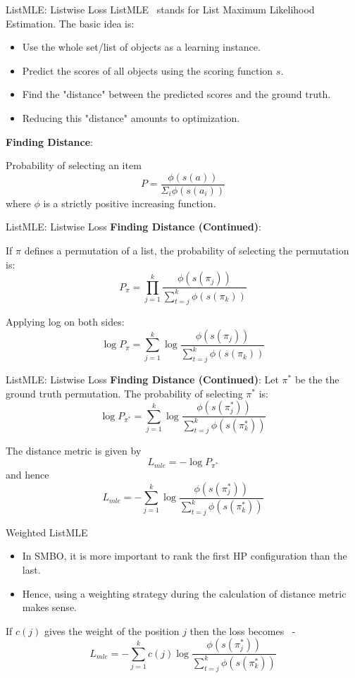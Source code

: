 \documentclass{beamer}
\begin{document}
\begin{frame}[t]{ListMLE: Listwise Loss}
ListMLE~\cite{listmlepaper} stands for List Maximum Likelihood Estimation.
The basic idea is:
\begin{itemize}
\item Use the whole set/list of objects as a learning instance.
\item Predict the scores of all objects using the scoring function $s$.
\item Find the "distance" between the predicted scores and the ground truth.
\item Reducing this "distance" amounts to optimization.
\end{itemize}

\textbf{Finding Distance}:

Probability of selecting an item
$$
P = \frac{\phi(s(a))}{\Sigma_i \phi(s(a_i))} 
$$
where $\phi$ is a strictly positive increasing function.
\end{frame}

\begin{frame}[t]{ListMLE: Listwise Loss}
\textbf{Finding Distance (Continued)}:

If $\pi$ defines a permutation of a list,  the probability of selecting the permutation is:
$$
P_{\pi} = \prod\limits_{j=1}^{k} \frac{\phi(s(\pi_j))}{ \sum\limits_{t=j}^k \phi(s(\pi_k))}
$$

Applying log on both sides:
$$
\log P_{\pi} = \sum\limits_{j=1}^{k} \log \frac{\phi(s(\pi_j))}{ \sum\limits_{t=j}^k \phi(s(\pi_k))}
$$

\end{frame}


\begin{frame}[t]{ListMLE: Listwise Loss}
\textbf{Finding Distance (Continued)}:
Let $\pi^*$ be the the ground truth permutation. The probability of selecting $\pi^*$ is:
$$
\log P_{\pi^*} = \sum\limits_{j=1}^{k} \log \frac{\phi(s(\pi^*_j))}{ \sum\limits_{t=j}^k \phi(s(\pi^*_k))}
$$

The distance metric is given by
$$
L_{mle} = - \log P_{\pi^*}
$$
and hence
$$
L_{mle} = -  \sum\limits_{j=1}^{k} \log \frac{\phi(s(\pi^*_j))}{ \sum\limits_{t=j}^k \phi(s(\pi^*_k))}
$$

\end{frame}

\begin{frame}[t]{Weighted ListMLE}
\begin{itemize}
\item In SMBO,  it is more important to rank the first HP configuration than the last.
\item Hence,  using a weighting strategy during the calculation of distance metric makes sense.
\end{itemize}

If $c(j)$ gives the weight of the position $j$ then the loss becomes~\cite{TRLWO} -
$$
L_{mle} = -  \sum\limits_{j=1}^{k} c(j) \log \frac{\phi(s(\pi^*_j))}{ \sum\limits_{t=j}^k \phi(s(\pi^*_k))}
$$

\end{frame}
\end{document}
